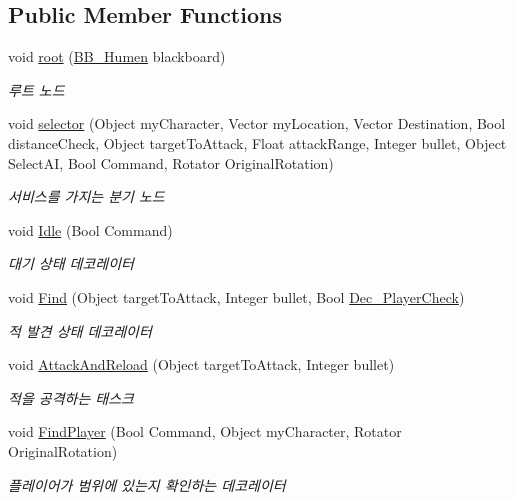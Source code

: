 \subsection*{Public Member Functions}
\begin{DoxyCompactItemize}
\item 
void \hyperlink{class_b_t___base_a54881cf55e411fdbf6c9f98586049742}{root} (\hyperlink{class_b_b___humen}{B\+B\+\_\+\+Humen} blackboard)
\begin{DoxyCompactList}\small\item\em 루트 노드 \end{DoxyCompactList}\item 
void \hyperlink{class_b_t___base_adbbf3731340b4e525a1ea549fd6409f3}{selector} (Object my\+Character, Vector my\+Location, Vector Destination, Bool distance\+Check, Object target\+To\+Attack, Float attack\+Range, Integer bullet, Object Select\+AI, Bool Command, Rotator Original\+Rotation)
\begin{DoxyCompactList}\small\item\em 서비스를 가지는 분기 노드 \end{DoxyCompactList}\item 
void \hyperlink{class_b_t___base_a68cb1b35bc3105c36e0bd4b8477a1ec9}{Idle} (Bool Command)
\begin{DoxyCompactList}\small\item\em 대기 상태 데코레이터 \end{DoxyCompactList}\item 
void \hyperlink{class_b_t___base_affb0d6cdaec417994ce78c7608e5bf9e}{Find} (Object target\+To\+Attack, Integer bullet, Bool \hyperlink{class_dec___player_check}{Dec\+\_\+\+Player\+Check})
\begin{DoxyCompactList}\small\item\em 적 발견 상태 데코레이터 \end{DoxyCompactList}\item 
void \hyperlink{class_b_t___base_a4473d81f72741d7b1b4956feada36a28}{Attack\+And\+Reload} (Object target\+To\+Attack, Integer bullet)
\begin{DoxyCompactList}\small\item\em 적을 공격하는 태스크 \end{DoxyCompactList}\item 
void \hyperlink{class_b_t___base_a185c89f6b41c5946e6dac9489f251c0f}{Find\+Player} (Bool Command, Object my\+Character, Rotator Original\+Rotation)
\begin{DoxyCompactList}\small\item\em 플레이어가 범위에 있는지 확인하는 데코레이터 \end{DoxyCompactList}\item 

\end{DoxyCompactItemize}
